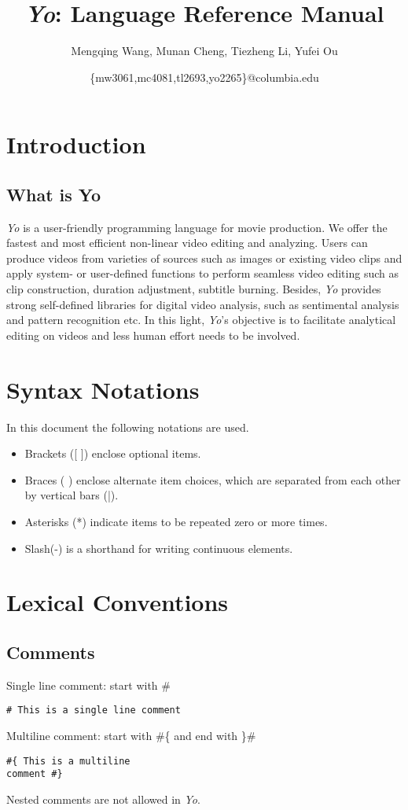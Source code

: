 \documentclass[12pt]{article}
\title{\textit{Yo}: Language Reference Manual}
\author{Mengqing Wang, Munan Cheng, Tiezheng Li, Yufei Ou}
\date{\{mw3061,mc4081,tl2693,yo2265\}@columbia.edu}
\begin{document}
\maketitle
\tableofcontents


\section{Introduction}
\subsection{What is Yo}
\textit{Yo} is a user-friendly programming language for movie production. We offer the fastest and most efficient non-linear video editing and analyzing. Users can produce videos from varieties of sources such as images or existing video clips and apply system- or user-defined functions to perform seamless video editing such as clip construction, duration adjustment, subtitle burning. Besides, \textit{Yo} provides strong self-defined libraries for digital video analysis, such as sentimental analysis and pattern recognition etc. In this light, \textit{Yo}'s objective is to facilitate analytical editing on videos and less human effort needs to be involved.


\section{Syntax Notations}
In this document the following notations are used. \\
\begin{itemize}
\item Brackets ([ ]) enclose optional items.
\item Braces ({ }) enclose alternate item choices, which are separated from each other by vertical bars (|).
\item Asterisks (*) indicate items to be repeated zero or more times.
\item Slash(-) is a shorthand for writing continuous elements. 
\end{itemize}

\section{Lexical Conventions}
\subsection{Comments} %
Single line comment: start with \#
\begin{lstlisting}[caption=single line comment]
# This is a single line comment
\end{lstlisting}
Multiline comment: start with \#\{ and end with \}\#
\begin{lstlisting}[caption=multi-line comment]
#{ This is a multiline
comment #}
\end{lstlisting}
Nested comments are not allowed in \textit{Yo}.
\end{document}
